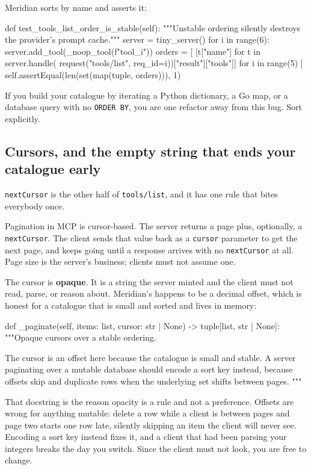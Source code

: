 Meridian sorts by name and asserts it:

\begin{py}
def test_tools_list_order_is_stable(self):
    """Unstable ordering silently destroys the provider's prompt cache."""
    server = tiny_server()
    for i in range(6):
        server.add_tool(_noop_tool(f"tool_{i}"))
    orders = [
        [t["name"] for t in server.handle(
            request("tools/list", req_id=i))["result"]["tools"]]
        for i in range(5)
    ]
    self.assertEqual(len(set(map(tuple, orders))), 1)
\end{py}

If you build your catalogue by iterating a Python dictionary, a Go map, or a
database query with no \texttt{ORDER BY}, you are one refactor away from this
bug. Sort explicitly.

\subsection{Cursors, and the empty string that ends your catalogue early}

\texttt{nextCursor} is the other half of \texttt{tools/list}, and it has one
rule that bites everybody once.

Pagination in MCP is cursor-based. The server returns a page plus, optionally, a
\texttt{nextCursor}. The client sends that value back as a \texttt{cursor}
parameter to get the next page, and keeps going until a response arrives with no
\texttt{nextCursor} at all. Page size is the server's business; clients must not
assume one.

The cursor is \textbf{opaque}. It is a string the server minted and the client
must not read, parse, or reason about. Meridian's happens to be a decimal
offset, which is honest for a catalogue that is small and sorted and lives in
memory:

\begin{py}
def _paginate(self, items: list, cursor: str | None) -> tuple[list, str | None]:
    """Opaque cursors over a stable ordering.

    The cursor is an offset here because the catalogue is small and stable.
    A server paginating over a mutable database should encode a sort key
    instead, because offsets skip and duplicate rows when the underlying
    set shifts between pages.
    """
\end{py}

That docstring is the reason opacity is a rule and not a preference. Offsets are
wrong for anything mutable: delete a row while a client is between pages and
page two starts one row late, silently skipping an item the client will never
see. Encoding a sort key instead fixes it, and a client that had been parsing
your integers breaks the day you switch. Since the client must not look, you are
free to change.

